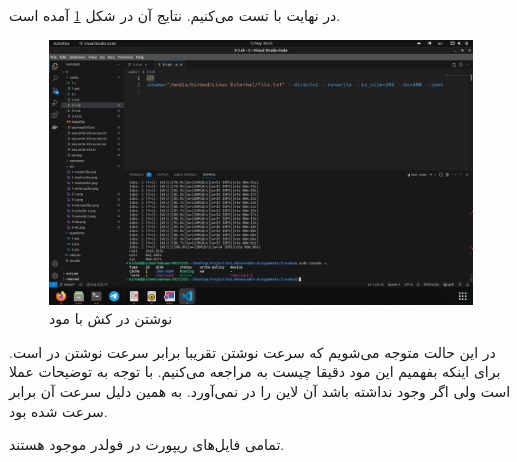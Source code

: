 در نهایت با
تست می‌کنیم.
نتایج آن در شکل
\ref{fig:3-4-wa}
آمده است.
\begin{figure}[H]
    \centering
    \includegraphics[scale=0.25]{pic/3-wa.png}
    \caption{نوشتن در کش با مود }
    \label{fig:3-4-wa}
\end{figure}
در این حالت متوجه می‌شویم که سرعت نوشتن تقریبا برابر سرعت نوشتن در
است. برای اینکه بفهمیم این مود دقیقا چیست به
مراجعه می‌کنیم. با توجه به توضیحات عملا
است ولی اگر
وجود نداشته باشد آن لاین را در
نمی‌آورد. به همین دلیل سرعت آن برابر سرعت
شده بود.

تمامی فایل‌های ریپورت
در فولدر
موجود هستند.

